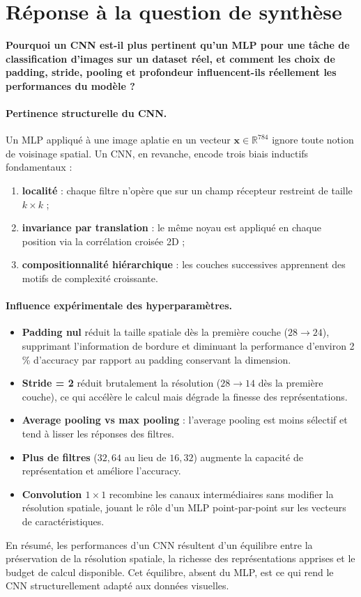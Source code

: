 \section{Réponse à la question de synthèse}
\textbf{Pourquoi un CNN est-il plus pertinent qu'un MLP pour une tâche de classification d'images sur un dataset réel, et comment les choix de padding, stride, pooling et profondeur influencent-ils réellement les performances du modèle ?}

\paragraph{Pertinence structurelle du CNN.}
Un MLP appliqué à une image aplatie en un vecteur $\mathbf{x}\in\mathbb{R}^{784}$
ignore toute notion de voisinage spatial. Un CNN, en revanche, encode trois biais
inductifs fondamentaux :
\begin{enumerate}
    \item \textbf{localité} : chaque filtre n'opère que sur un champ récepteur
          restreint de taille $k \times k$ ;
    \item \textbf{invariance par translation} : le même noyau est appliqué en
          chaque position via la corrélation croisée 2D ;
    \item \textbf{compositionnalité hiérarchique} : les couches successives
          apprennent des motifs de complexité croissante.
\end{enumerate}

\paragraph{Influence expérimentale des hyperparamètres.}
\begin{itemize}
    \item \textbf{Padding nul} réduit la taille spatiale dès la première couche
          ($28 \to 24$), supprimant l'information de bordure et diminuant la
          performance d'environ 2\,\% d'accuracy par rapport au padding conservant
          la dimension.
    \item \textbf{Stride = 2} réduit brutalement la résolution ($28 \to 14$ dès la
          première couche), ce qui accélère le calcul mais dégrade la finesse des
          représentations.
    \item \textbf{Average pooling vs max pooling} : l'average pooling est moins
          sélectif et tend à lisser les réponses des filtres.
    \item \textbf{Plus de filtres} ($32, 64$ au lieu de $16, 32$) augmente la
          capacité de représentation et améliore l'accuracy.
    \item \textbf{Convolution $1 \times 1$} recombine les canaux intermédiaires
          sans modifier la résolution spatiale, jouant le rôle d'un MLP
          point-par-point sur les vecteurs de caractéristiques.
\end{itemize}
En résumé, les performances d'un CNN résultent d'un équilibre entre la
préservation de la résolution spatiale, la richesse des représentations
apprises et le budget de calcul disponible. Cet équilibre, absent du MLP,
est ce qui rend le CNN structurellement adapté aux données visuelles.
